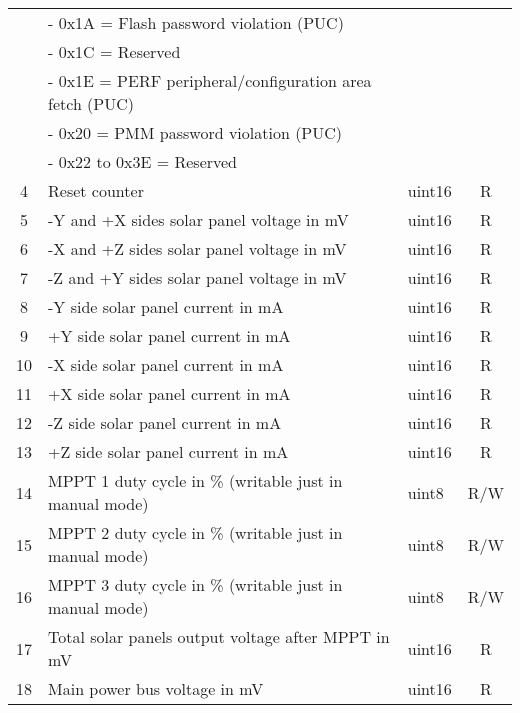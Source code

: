 \begin{longtable}[c]{cL{0.72\textwidth}lc}
        & - 0x1A = Flash password violation (PUC)                           &        &  \\
        & - 0x1C = Reserved                                                 &        &  \\
        & - 0x1E = PERF peripheral/configuration area fetch (PUC)           &        &  \\
        & - 0x20 = PMM password violation (PUC)                             &        &  \\
        & - 0x22 to 0x3E = Reserved                                         &        &  \\
    4   & Reset counter                                                     & uint16 & R \\
    5   & -Y and +X sides solar panel voltage in mV                         & uint16 & R \\
    6   & -X and +Z sides solar panel voltage in mV                         & uint16 & R \\
    7   & -Z and +Y sides solar panel voltage in mV                         & uint16 & R \\
    8   & -Y side solar panel current in mA                                 & uint16 & R \\
    9   & +Y side solar panel current in mA                                 & uint16 & R \\
    10  & -X side solar panel current in mA                                 & uint16 & R \\
    11  & +X side solar panel current in mA                                 & uint16 & R \\
    12  & -Z side solar panel current in mA                                 & uint16 & R \\
    13  & +Z side solar panel current in mA                                 & uint16 & R \\
    14  & MPPT 1 duty cycle in \% (writable just in manual mode)            & uint8  & R/W \\
    15  & MPPT 2 duty cycle in \% (writable just in manual mode)            & uint8  & R/W \\
    16  & MPPT 3 duty cycle in \% (writable just in manual mode)            & uint8  & R/W \\
    17  & Total solar panels output voltage after MPPT in mV                & uint16 & R \\
    18  & Main power bus voltage in mV                                      & uint16 & R \\

\end{longtable}
